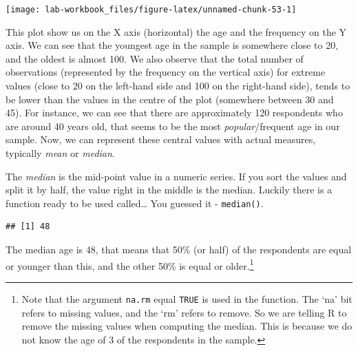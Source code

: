 \documentclass[
]{book}
\newenvironment{Shaded}{\begin{snugshade}}{\end{snugshade}}
\newcommand{\AttributeTok}[1]{\textcolor[rgb]{0.13,0.29,0.53}{#1}}
\newcommand{\ConstantTok}[1]{\textcolor[rgb]{0.56,0.35,0.01}{#1}}
\newcommand{\FunctionTok}[1]{\textcolor[rgb]{0.13,0.29,0.53}{\textbf{#1}}}
\newcommand{\NormalTok}[1]{#1}
\newcommand{\SpecialCharTok}[1]{\textcolor[rgb]{0.81,0.36,0.00}{\textbf{#1}}}
\begin{document}
\begin{Shaded}
\end{Shaded}

\begin{flushleft}\texttt{[image: lab-workbook\_files/figure-latex/unnamed-chunk-53-1]} \end{flushleft}

This plot show us on the X axis (horizontal) the age and the frequency on the Y axis. We can see that the youngest age in the sample is somewhere close to 20, and the oldest is almost 100. We also observe that the total number of observations (represented by the frequency on the vertical axis) for extreme values (close to 20 on the left-hand side and 100 on the right-hand side), tends to be lower than the values in the centre of the plot (somewhere between 30 and 45). For instance, we can see that there are approximately 120 respondents who are around 40 years old, that seems to be the most \emph{popular}/frequent age in our sample. Now, we can represent these central values with actual measures, typically \emph{mean} or \emph{median}.

The \emph{median} is the mid-point value in a numeric series. If you sort the values and split it by half, the value right in the middle is the median. Luckily there is a function ready to be used called\ldots{} You guessed it - \texttt{median()}.

\begin{Shaded}
\end{Shaded}

\begin{verbatim}
## [1] 48
\end{verbatim}

The median age is 48, that means that 50\% (or half) of the respondents are equal or younger than this, and the other 50\% is equal or older.\footnote{Note that the argument \texttt{na.rm} equal \texttt{TRUE} is used in the function. The `na' bit refers to missing values, and the `rm' refers to remove. So we are telling R to remove the missing values when computing the median. This is because we do not know the age of 3 of the respondents in the sample.}
\end{document}
